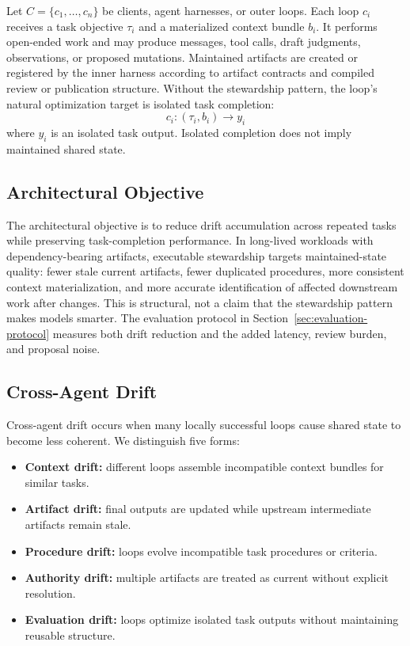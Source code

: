 \documentclass{article}
\begin{document}
Let $C=\{c_1,\ldots,c_n\}$ be clients, agent harnesses, or outer loops. Each loop $c_i$ receives a task objective $\tau_i$ and a materialized context bundle $b_i$. It performs open-ended work and may produce messages, tool calls, draft judgments, observations, or proposed mutations. Maintained artifacts are created or registered by the inner harness according to artifact contracts and compiled review or publication structure. Without the stewardship pattern, the loop's natural optimization target is isolated task completion:
\begin{equation}
c_i: (\tau_i, b_i) \rightarrow y_i
\end{equation}
where $y_i$ is an isolated task output. Isolated completion does not imply maintained shared state.

\subsection{Architectural Objective}

The architectural objective is to reduce drift accumulation across repeated tasks while preserving task-completion performance. In long-lived workloads with dependency-bearing artifacts, executable stewardship targets maintained-state quality: fewer stale current artifacts, fewer duplicated procedures, more consistent context materialization, and more accurate identification of affected downstream work after changes. This is structural, not a claim that the stewardship pattern makes models smarter. The evaluation protocol in Section~\ref{sec:evaluation-protocol} measures both drift reduction and the added latency, review burden, and proposal noise.

\subsection{Cross-Agent Drift}

Cross-agent drift occurs when many locally successful loops cause shared state to become less coherent. We distinguish five forms:
\begin{itemize}[leftmargin=*]
\item \textbf{Context drift:} different loops assemble incompatible context bundles for similar tasks.
\item \textbf{Artifact drift:} final outputs are updated while upstream intermediate artifacts remain stale.
\item \textbf{Procedure drift:} loops evolve incompatible task procedures or criteria.
\item \textbf{Authority drift:} multiple artifacts are treated as current without explicit resolution.
\item \textbf{Evaluation drift:} loops optimize isolated task outputs without maintaining reusable structure.
\end{itemize}
\end{document}
